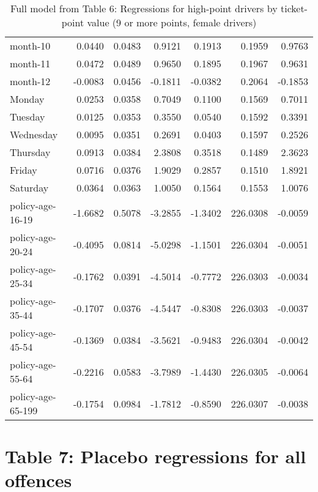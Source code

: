 \documentclass[10pt]{article}
\begin{document}
\begin{table}[ht]
\begin{tabular}{lrrrrrr}
  month-10 & 0.0440 & 0.0483 & 0.9121 & 0.1913 & 0.1959 & 0.9763 \\ 
  month-11 & 0.0472 & 0.0489 & 0.9650 & 0.1895 & 0.1967 & 0.9631 \\ 
  month-12 & -0.0083 & 0.0456 & -0.1811 & -0.0382 & 0.2064 & -0.1853 \\ 
  Monday & 0.0253 & 0.0358 & 0.7049 & 0.1100 & 0.1569 & 0.7011 \\ 
  Tuesday & 0.0125 & 0.0353 & 0.3550 & 0.0540 & 0.1592 & 0.3391 \\ 
  Wednesday & 0.0095 & 0.0351 & 0.2691 & 0.0403 & 0.1597 & 0.2526 \\ 
  Thursday & 0.0913 & 0.0384 & 2.3808 & 0.3518 & 0.1489 & 2.3623 \\ 
  Friday & 0.0716 & 0.0376 & 1.9029 & 0.2857 & 0.1510 & 1.8921 \\ 
  Saturday & 0.0364 & 0.0363 & 1.0050 & 0.1564 & 0.1553 & 1.0076 \\ 
  policy-age-16-19 & -1.6682 & 0.5078 & -3.2855 & -1.3402 & 226.0308 & -0.0059 \\ 
  policy-age-20-24 & -0.4095 & 0.0814 & -5.0298 & -1.1501 & 226.0304 & -0.0051 \\ 
  policy-age-25-34 & -0.1762 & 0.0391 & -4.5014 & -0.7772 & 226.0303 & -0.0034 \\ 
  policy-age-35-44 & -0.1707 & 0.0376 & -4.5447 & -0.8308 & 226.0303 & -0.0037 \\ 
  policy-age-45-54 & -0.1369 & 0.0384 & -3.5621 & -0.9483 & 226.0304 & -0.0042 \\ 
  policy-age-55-64 & -0.2216 & 0.0583 & -3.7989 & -1.4430 & 226.0305 & -0.0064 \\ 
  policy-age-65-199 & -0.1754 & 0.0984 & -1.7812 & -0.8590 & 226.0307 & -0.0038 \\ 
   \hline
\end{tabular}
\caption{Full model from Table 6: Regressions for high-point drivers by ticket-point value (9 or more points, female drivers)} 
\label{tab_6_9plus_pts_F}
\end{table}


\clearpage
\pagebreak




\section{Table 7: Placebo regressions for all offences}
\end{document}
